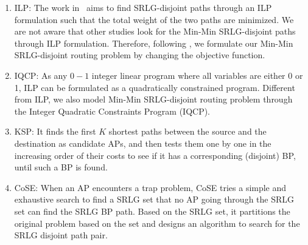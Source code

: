\begin{enumerate}
  \item ILP: The work in~\cite{hu2003diverse}  aims to find SRLG-disjoint paths through an ILP formulation such that the total weight of the two paths are minimized. We are not aware that other studies look for the Min-Min SRLG-disjoint paths through ILP formulation. Therefore, following \cite{hu2003diverse}, we formulate  our Min-Min SRLG-disjoint routing problem by changing the objective function.
  \item IQCP: As any $0-1$ integer linear program where all variables are either 0 or 1,  ILP can be formulated as a quadratically constrained program. Different from ILP, we also model Min-Min SRLG-disjoint routing problem through the Integer Quadratic Constraints Program (IQCP)\cite{hu2003diverse}.
  \item KSP\cite{eppstein1998finding}: It finds the first $K$ shortest paths between the source and the destination as candidate APs, and then tests them one by one in the increasing order of their costs to see if it has a corresponding (disjoint) BP, until such a BP is found.
  \item CoSE\cite{rostami2007cose}: When an AP encounters a trap problem, CoSE tries a simple and exhaustive search to find a SRLG set that no AP going through the SRLG set can find the SRLG BP path. Based on the SRLG set,   it partitions the original problem based on the set and designs an algorithm to search for the SRLG disjoint path pair.
\end{enumerate}

